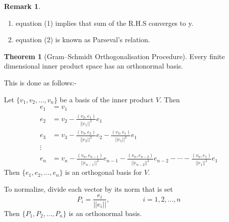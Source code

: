 \documentclass[11pt,a4paper]{article}
\theoremstyle{definition}
\newtheorem{thm}{Theorem}[section]
\newtheorem*{remark}{Remark}
\begin{document}
\begin{remark}
\begin{enumerate}
\item[i] equation (1) implies that sum of the R.H.S converges to y.
\item[ii] equation (2) is known as Parseval's relation.
\end{enumerate}
\end{remark}

\begin{thm}[Gram--Schmidt Orthogonalisation Procedure]
Every finite dimensional inner product space has an orthonormal basis.


This is done as follows:-

Let $\{v_1,v_2,\dots,v_n\}$ be a basis of the inner product $V$. Then
\begin{align*}
e_1 &=v_1\\
e_2 &=v_2-\frac{(v_2,e_1)}{||e_1||^2}e_1\\
e_3 &=v_3-\frac{(v_3,e_2)}{||e_2||^2}e_2-\frac{(v_3,e_1)}{||e_1||^2}e_1\\
\vdots\\
e_n &=v_n-\frac{(v_n,e_{n-1})}{||e_{n-1}||^2}e_{n-1}-\frac{(v_n,e_{n-2})}{||e_{n-2}||^2}e_{n-2}-\cdots-\frac{(v_n,e_1)}{||e_1||^2}e_1
\end{align*}
Then $\{e_1,e_2,\dots,e_n\}$ is an orthogonal basis for $V$.

To normalize, divide each vector by its norm that is set\\ $$P_i=\frac{e_i}{||e_i||},\hspace{2cm} i=1,2,\dots,n$$ Then $\{P_1,P_2,\dots,P_n\}$ is an orthonormal basis.
\end{thm}
\end{document}
